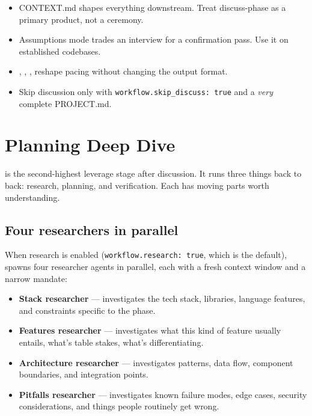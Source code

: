 \documentclass[11pt,letterpaper,openany]{book}
\begin{document}
\begin{gsdnote}[title=Key Takeaways]
\begin{itemize}[itemsep=2pt,leftmargin=1.2em]
  \item CONTEXT.md shapes everything downstream. Treat discuss-phase as a primary product, not a ceremony.
  \item Assumptions mode trades an interview for a confirmation pass. Use it on established codebases.
  \item {}, , ,  reshape pacing without changing the output format.
  \item Skip discussion only with \texttt{workflow.skip\_discuss: true} and a \emph{very} complete PROJECT.md.
\end{itemize}
\end{gsdnote}

\chapter{Planning Deep Dive}

 is the second-highest leverage stage after discussion. It runs three things back to back: research, planning, and verification. Each has moving parts worth understanding.

\section{Four researchers in parallel}

When research is enabled (\texttt{workflow.research: true}, which is the default),  spawns four researcher agents in parallel, each with a fresh context window and a narrow mandate:

\begin{itemize}[itemsep=2pt]
  \item \textbf{Stack researcher} --- investigates the tech stack, libraries, language features, and constraints specific to the phase.
  \item \textbf{Features researcher} --- investigates what this kind of feature usually entails, what's table stakes, what's differentiating.
  \item \textbf{Architecture researcher} --- investigates patterns, data flow, component boundaries, and integration points.
  \item \textbf{Pitfalls researcher} --- investigates known failure modes, edge cases, security considerations, and things people routinely get wrong.
\end{itemize}
\end{document}
